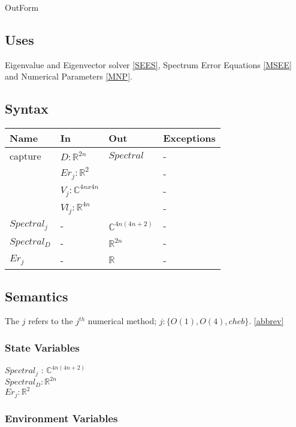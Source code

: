 \documentclass[12pt, titlepage]{article}
\begin{document}
OutForm

\subsection{Uses}

Eigenvalue and Eigenvector solver \ref{SEES}, Spectrum Error Equations 
\ref{MSEE} and Numerical 
Parameters \ref{MNP}. 

\subsection{Syntax} 

\begin{center}
	\begin{tabular}{p{3cm} p{3cm} p{3cm} >{\raggedright\arraybackslash}p{7cm}}
		\toprule
		\textbf{Name} & \textbf{In} & \textbf{Out} & \textbf{Exceptions}  \\
		\hline
		capture & $D :\mathbb{R}^{2n}$ & $Spectral$ & - \\ 
		 & $Er_{j} :\mathbb{R}^{2}$ &  & - \\ 
		 & $V_{j} :\mathbb{C}^{4nx4n}$ &  & - \\ 
		 & $Vl_{j} :\mathbb{R}^{4n}$ & & - \\
		$Spectral_{j}$ & - & $\mathbb{C}^{4n(4n+2)}$ & - \\
		$Spectral_{D}$ & - & $\mathbb{R}^{2n}$ & - \\
		$Er_{j}$ & - & $\mathbb{R}$ & - \\
		\hline
	\end{tabular}
\end{center}

\subsection{Semantics}

The $j$ refers to the $j^{th}$ numerical method; $j : \{ O(1), O(4), cheb \}$. 
\ref{abbrev}

\subsubsection{State Variables}

$Spectral_{j}$ : $\mathbb{C}^{4n(4n+2)}$ \\
$Spectral_{D}: \mathbb{R}^{2n}$ \\
$Er_j : \mathbb{R}^{2}$   

\subsubsection{Environment Variables}
\end{document}
